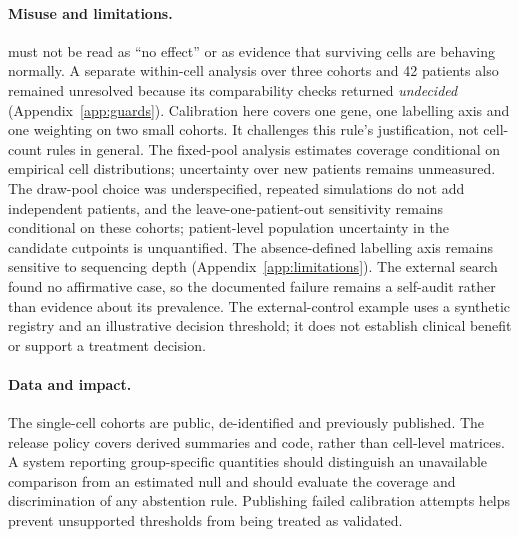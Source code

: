 \paragraph{Misuse and limitations.}
\notest{} must not be read as ``no effect'' or as evidence that surviving cells
are behaving normally. A separate within-cell analysis over three cohorts and
42 patients also remained unresolved because its comparability checks returned
\emph{undecided} (Appendix~\ref{app:guards}). Calibration here covers one gene,
one labelling axis and one weighting on two small cohorts. It challenges this
rule's justification, not cell-count rules in general. The fixed-pool analysis estimates coverage conditional on empirical cell
distributions; uncertainty over new patients remains unmeasured. The draw-pool choice was
underspecified, repeated simulations do not add independent patients, and
the leave-one-patient-out sensitivity remains conditional on these cohorts;
patient-level population uncertainty in the candidate cutpoints is unquantified.
The absence-defined labelling axis remains sensitive to sequencing depth
(Appendix~\ref{app:limitations}). The external search found no affirmative case, so the documented failure
remains a self-audit rather than evidence about its prevalence. The external-control
example uses a synthetic registry and an illustrative decision threshold;
it does not establish clinical benefit or support a treatment decision.

\paragraph{Data and impact.}
The single-cell cohorts are public, de-identified and previously published.
The release policy covers derived summaries and code, rather than cell-level
matrices. A system reporting group-specific quantities should distinguish an
unavailable comparison from an estimated null and should evaluate the coverage
and discrimination of any abstention rule. Publishing failed calibration
attempts helps prevent unsupported thresholds from being treated as validated.
